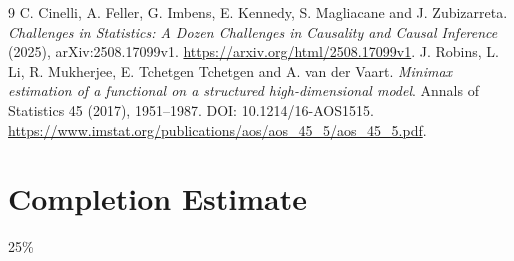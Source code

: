 \documentclass[11pt]{article}
\theoremstyle{definition}
\begin{document}
\begin{thebibliography}{9}
 C. Cinelli, A. Feller, G. Imbens, E. Kennedy, S. Magliacane and J. Zubizarreta.
\emph{Challenges in Statistics: A Dozen Challenges in Causality and Causal Inference} (2025), arXiv:2508.17099v1.
\url{https://arxiv.org/html/2508.17099v1}.
 J. Robins, L. Li, R. Mukherjee, E. Tchetgen Tchetgen and A. van der Vaart.
\emph{Minimax estimation of a functional on a structured high-dimensional model}.
Annals of Statistics 45 (2017), 1951--1987. DOI: 10.1214/16-AOS1515.
\url{https://www.imstat.org/publications/aos/aos_45_5/aos_45_5.pdf}.
\end{thebibliography}
\section{Completion Estimate}
25\%
\end{document}
